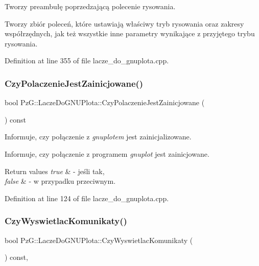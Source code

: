 Tworzy preambułę poprzedzającą polecenie rysowania. 

Tworzy zbiór poleceń, które ustawiają właściwy tryb rysowania oraz zakresy współrzędnych, jak też wszystkie inne parametry wynikające z przyjętego trybu rysowania. 

Definition at line 355 of file lacze\+\_\+do\+\_\+gnuplota.\+cpp.

\mbox{\label{class_pz_g_1_1_lacze_do_g_n_u_plota_af8be8aeb3b1b524fab67d4411cba5b9e}} 
\subsubsection{\texorpdfstring{Czy\+Polaczenie\+Jest\+Zainicjowane()}{CzyPolaczenieJestZainicjowane()}}
{\footnotesize\ttfamily bool Pz\+G\+::\+Lacze\+Do\+G\+N\+U\+Plota\+::\+Czy\+Polaczenie\+Jest\+Zainicjowane (\begin{DoxyParamCaption}{ }\end{DoxyParamCaption}) const}



Informuje, czy połączenie z {\itshape gnuplot\textquotesingle{}em} jest zainicjalizowane. 

Informuje, czy połączenie z programem {\itshape gnuplot} jest zainicjowane. 
\begin{DoxyRetVals}{Return values}
{\em true} & -\/ jeśli tak, \\
\hline
{\em false} & -\/ w przypadku przeciwnym. \\
\hline
\end{DoxyRetVals}


Definition at line 124 of file lacze\+\_\+do\+\_\+gnuplota.\+cpp.

\mbox{\label{class_pz_g_1_1_lacze_do_g_n_u_plota_a5e4f3a226ed36f7110032d802d84847c}} 
\subsubsection{\texorpdfstring{Czy\+Wyswietlac\+Komunikaty()}{CzyWyswietlacKomunikaty()}}
{\footnotesize\ttfamily bool Pz\+G\+::\+Lacze\+Do\+G\+N\+U\+Plota\+::\+Czy\+Wyswietlac\+Komunikaty (\begin{DoxyParamCaption}{ }\end{DoxyParamCaption}) const\hspace{0.3cm}{\ttfamily [inline]}, {\ttfamily [protected]}}



